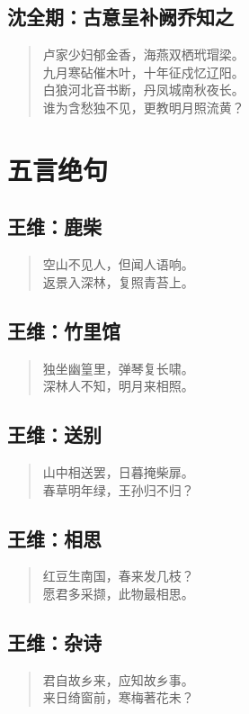 \documentclass[12pt,oneside]{book}
\newenvironment{shici}{%
\begin{verse}\centering\yanti\large\hspace{12pt}}{\end{verse}}
\begin{document}
\begin{common-format}
\chapter{沈全期：古意呈补阙乔知之}
\begin{shici}
卢家少妇郁金香，海燕双栖玳瑁梁。\\
九月寒砧催木叶，十年征戍忆辽阳。\\
白狼河北音书断，丹凤城南秋夜长。\\
谁为含愁独不见，更教明月照流黄？
\end{shici}


\part{五言绝句}
\chapter{王维：鹿柴}
\begin{shici}
空山不见人，但闻人语响。\\
返景入深林，复照青苔上。
\end{shici}

\chapter{王维：竹里馆}
\begin{shici}
独坐幽篁里，弹琴复长啸。\\
深林人不知，明月来相照。
\end{shici}

\chapter{王维：送别}
\begin{shici}
山中相送罢，日暮掩柴扉。\\
春草明年绿，王孙归不归？
\end{shici}

\chapter{王维：相思}
\begin{shici}
红豆生南国，春来发几枝？\\
愿君多采撷，此物最相思。
\end{shici}

\chapter{王维：杂诗}
\begin{shici}
君自故乡来，应知故乡事。\\
来日绮窗前，寒梅著花未？
\end{shici}


\end{common-format}
\end{document}
